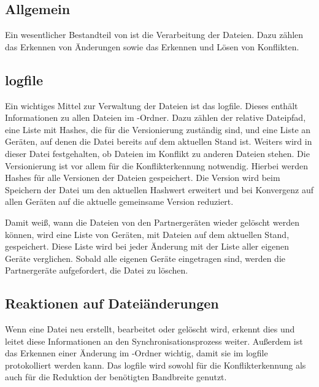 \subsection{Allgemein}
Ein wesentlicher Bestandteil von \sblit ist die Verarbeitung der Dateien. Dazu zählen das Erkennen von Änderungen sowie das Erkennen und Lösen von Konflikten.
\subsection{\gls{logfile}}\label{Logfile}
Ein wichtiges Mittel zur Verwaltung der Dateien ist das \gls{logfile}. Dieses enthält Informationen zu allen Dateien im \sblit-Ordner. Dazu zählen der relative Dateipfad, eine Liste mit Hashes, die für die Versionierung zuständig sind, und eine Liste an Geräten, auf denen die Datei bereits auf dem aktuellen Stand ist. Weiters wird in dieser Datei festgehalten, ob Dateien im Konflikt zu anderen Dateien stehen. Die Versionierung ist vor allem für die Konflikterkennung  notwendig. Hierbei werden Hashes für alle Versionen der Dateien gespeichert. Die Version wird beim Speichern der Datei um den aktuellen Hashwert erweitert und bei Konvergenz auf allen Geräten auf die aktuelle gemeinsame Version reduziert. 

Damit \sblit weiß, wann die Dateien von den Partnergeräten  wieder gelöscht werden können, wird eine Liste von Geräten, mit Dateien auf dem aktuellen Stand, gespeichert. Diese Liste wird bei jeder Änderung mit der Liste aller eigenen Geräte verglichen. Sobald alle eigenen Geräte eingetragen sind, werden die Partnergeräte aufgefordert, die Datei zu löschen. 

\subsection{Reaktionen auf Dateiänderungen}
Wenn eine Datei neu erstellt, bearbeitet oder gelöscht wird, erkennt dies \sblit und leitet diese Informationen an den Synchronisationsprozess weiter. Außerdem ist das Erkennen einer Änderung im \sblit-Ordner wichtig, damit sie im \gls{logfile} protokolliert werden kann. Das \gls{logfile} wird sowohl für die Konflikterkennung  als auch für die Reduktion der benötigten Bandbreite  genutzt.

